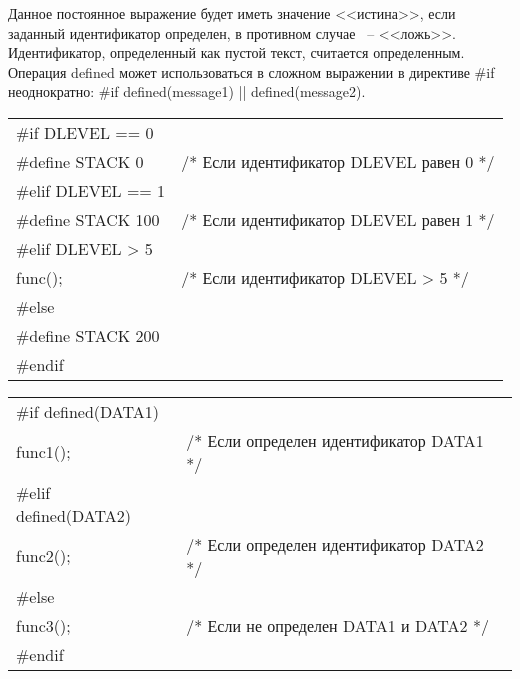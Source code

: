 Данное постоянное выражение будет иметь значение <<истина>>, если заданный идентификатор определен, в противном случае ~-- <<ложь>>. Идентификатор, определенный как пустой текст, считается определенным. Операция defined может использоваться в сложном выражении в директиве \#if неоднократно: \#if defined(message1) || defined(message2).\killoverfullbefore \BL

\renewcommand{\arraystretch}{1.2} %
\renewcommand{\tabcolsep}{0.2cm}   %
\begin{pExample}
\begin{tabular}{ l l }
\#if DLEVEL == 0 & \textcolor{exComm}{}  \\
\indent \indent \#define STACK 0 & \textcolor{exComm}{/* Если идентификатор DLEVEL равен 0 */} \\
\#elif DLEVEL == 1 & \textcolor{exComm}{} \\
\indent \indent \#define STACK 100 & \textcolor{exComm}{/* Если идентификатор DLEVEL равен 1 */} \\
\#elif DLEVEL > 5 & \textcolor{exComm}{} \\
\indent \indent func(); & \textcolor{exComm}{/* Если идентификатор DLEVEL > 5 */} \\
\#else & \textcolor{exComm}{} \\
\indent \indent \#define STACK 200 & \textcolor{exComm}{ }\\
\#endif & \textcolor{exComm}{} \\
\end{tabular}
\end{pExample}

\begin{pExample}
\begin{tabular}{ l l }
\#if defined(DATA1) & \textcolor{exComm}{}  \\
\indent \indent func1(); & \textcolor{exComm}{/* Если определен идентификатор DATA1 */}\\
\#elif  defined(DATA2) & \textcolor{exComm}{} \\
\indent \indent func2(); & \textcolor{exComm}{/* Если определен идентификатор DATA2 */}\\
\#else  & \textcolor{exComm}{} \\
\indent \indent func3(); & \textcolor{exComm}{/* Если не определен DATA1 и DATA2 */}\\
\#endif & \textcolor{exComm}{} \\
\end{tabular}
\end{pExample}

